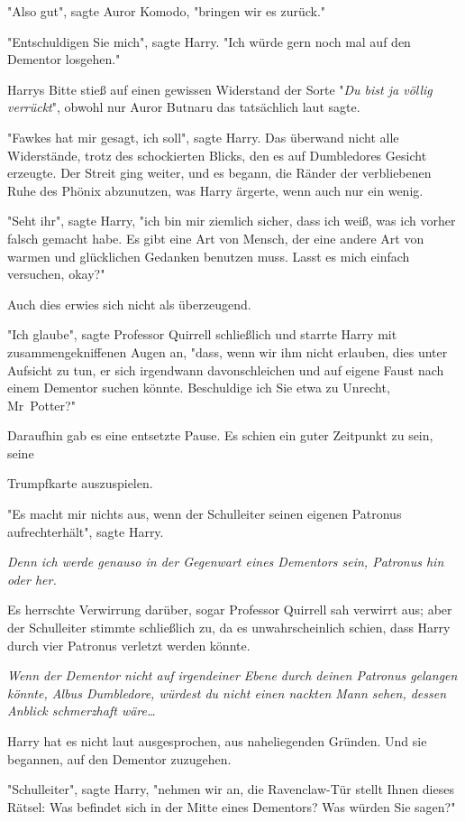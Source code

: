 {"Also gut", sagte Auror Komodo, "bringen wir es zurück."

"Entschuldigen Sie mich", sagte Harry. "Ich würde gern noch mal auf den Dementor losgehen."

Harrys Bitte stieß auf einen gewissen Widerstand der Sorte "\emph{Du bist ja völlig verrückt}", obwohl nur Auror Butnaru das tatsächlich laut sagte.

"Fawkes hat mir gesagt, ich soll", sagte Harry. Das überwand nicht alle Widerstände, trotz des schockierten Blicks, den es auf Dumbledores Gesicht erzeugte. Der Streit ging weiter, und es begann, die Ränder der verbliebenen Ruhe des Phönix abzunutzen, was Harry ärgerte, wenn auch nur ein wenig.

"Seht ihr", sagte Harry, "ich bin mir ziemlich sicher, dass ich weiß, was ich vorher falsch gemacht habe. Es gibt eine Art von Mensch, der eine andere Art von warmen und glücklichen Gedanken benutzen muss. Lasst es mich einfach versuchen, okay?"

Auch dies erwies sich nicht als überzeugend.

"Ich glaube", sagte Professor Quirrell schließlich und starrte Harry mit zusammengekniffenen Augen an, "dass, wenn wir ihm nicht erlauben, dies unter Aufsicht zu tun, er sich irgendwann davonschleichen und auf eigene Faust nach einem Dementor suchen könnte. Beschuldige ich Sie etwa zu Unrecht, Mr~Potter?"

Daraufhin gab es eine entsetzte Pause. Es schien ein guter Zeitpunkt zu sein, seine

Trumpfkarte auszuspielen.

"Es macht mir nichts aus, wenn der Schulleiter seinen eigenen Patronus aufrechterhält", sagte Harry.

\emph{Denn ich werde genauso in der Gegenwart eines Dementors sein, Patronus hin oder her.}

Es herrschte Verwirrung darüber, sogar Professor Quirrell sah verwirrt aus; aber der Schulleiter stimmte schließlich zu, da es unwahrscheinlich schien, dass Harry durch vier Patronus verletzt werden könnte.

\emph{Wenn der Dementor nicht auf irgendeiner Ebene durch deinen Patronus gelangen könnte, Albus Dumbledore, würdest du nicht einen nackten Mann sehen, dessen Anblick schmerzhaft wäre…}

Harry hat es nicht laut ausgesprochen, aus naheliegenden Gründen. Und sie begannen, auf den Dementor zuzugehen.

"Schulleiter", sagte Harry, "nehmen wir an, die Ravenclaw-Tür stellt Ihnen dieses Rätsel: Was befindet sich in der Mitte eines Dementors? Was würden Sie sagen?"

}
